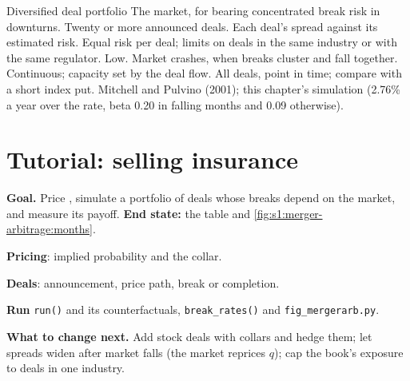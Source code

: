 \begin{strategyfile}{Diversified deal portfolio}\label{strat:s1:merger-arbitrage:portfolio}
 The market, for bearing concentrated break risk in downturns.
 Twenty or more announced deals.
 Each deal's spread against its estimated risk.
 Equal risk per deal; limits on deals in the same industry or with the same regulator.
 Low.
 Market crashes, when breaks cluster and  fall together.
 Continuous; capacity set by the deal flow.
 All deals, point in time; compare with a short index put.
 Mitchell and Pulvino (2001); this chapter's simulation (2.76\% a year over the rate, beta 0.20 in falling months and 0.09 otherwise).
\end{strategyfile}

\section{Tutorial: selling insurance}\label{tut:s1:merger-arbitrage:tut}

\begin{tutorial}
\textbf{Goal.} Price , simulate a portfolio of deals whose breaks depend on the market, and measure its payoff. \textbf{End state:} the table
and \cref{fig:s1:merger-arbitrage:months}.
\begin{tutsteps}
\item \textbf{Pricing}: implied probability and the collar.
\label{lst:s1:merger-arbitrage:pricing}
\item \textbf{Deals}: announcement, price path, break or completion.
\label{lst:s1:merger-arbitrage:deals}
\item \textbf{Run} \texttt{run()} and its counterfactuals, \texttt{break\_rates()} and \texttt{fig\_mergerarb.py}.
\end{tutsteps}
\textbf{What to change next.} Add stock deals with collars and hedge them; let spreads widen after market falls (the market reprices $q$); cap the book's
exposure to deals in one industry.
\end{tutorial}


